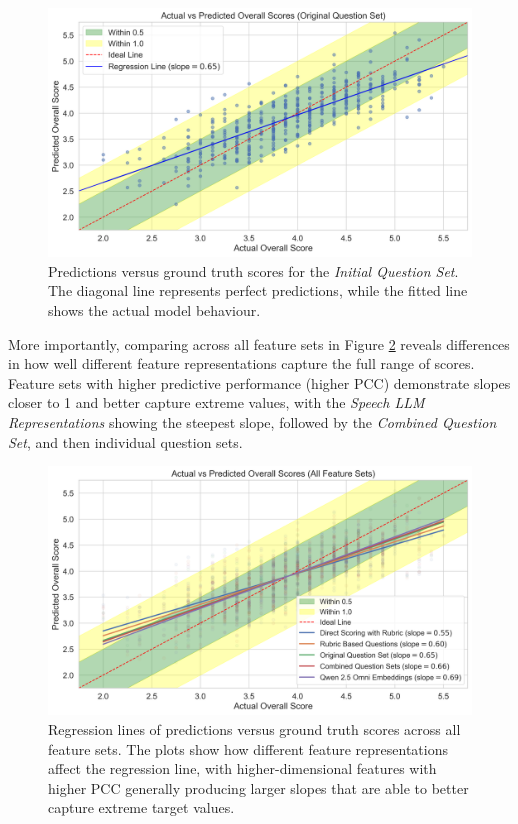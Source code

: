 \documentclass{report}
\begin{document}
\begin{figure}[h]
  \centering
  \includegraphics[width=1\linewidth]{images/actual_vs_predicted_orig.png}
  \caption{Predictions versus ground truth scores for the \emph{Initial Question Set}. The diagonal line represents perfect predictions, while the fitted line shows the actual model behaviour.}
  \label{fig:predictions_vs_ground_truth_original}
\end{figure}

More importantly, comparing across all feature sets in Figure \ref{fig:predictions_vs_ground_truth_all} reveals differences in how well different feature representations capture the full range of scores. Feature sets with higher predictive performance (higher PCC) demonstrate slopes closer to 1 and better capture extreme values, with the \emph{Speech LLM Representations} showing the steepest slope, followed by the \emph{Combined Question Set}, and then individual question sets.

\begin{figure}[h]
  \centering
  \includegraphics[width=1\linewidth]{images/actual_vs_predicted_all.png}
  \caption{Regression lines of predictions versus ground truth scores across all feature sets. The plots show how different feature representations affect the regression line, with higher-dimensional features with higher PCC generally producing larger slopes that are able to better capture extreme target values.}
  \label{fig:predictions_vs_ground_truth_all}
\end{figure}
\end{document}
